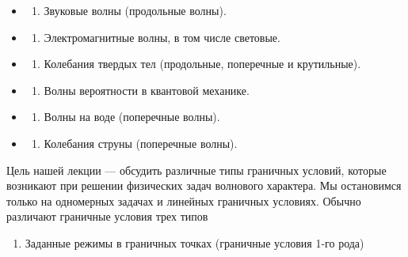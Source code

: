 \documentclass[
  ukrainian,
]{article}
\providecommand{\tightlist}{%
  \setlength{\itemsep}{0pt}\setlength{\parskip}{0pt}}
\begin{document}
\begin{itemize}
\tightlist
\item
  \begin{enumerate}
  \def\labelenumi{\arabic{enumi}.}
  \tightlist
  \item
    Звуковые волны (продольные волны).
  \end{enumerate}
\item
  \begin{enumerate}
  \def\labelenumi{\arabic{enumi}.}
  \setcounter{enumi}{1}
  \tightlist
  \item
    Электромагнитные волны, в том числе световые.
  \end{enumerate}
\item
  \begin{enumerate}
  \def\labelenumi{\arabic{enumi}.}
  \setcounter{enumi}{2}
  \tightlist
  \item
    Колебания твердых тел (продольные, поперечные и крутильные).
  \end{enumerate}
\item
  \begin{enumerate}
  \def\labelenumi{\arabic{enumi}.}
  \setcounter{enumi}{3}
  \tightlist
  \item
    Волны вероятности в квантовой механике.
  \end{enumerate}
\item
  \begin{enumerate}
  \def\labelenumi{\arabic{enumi}.}
  \setcounter{enumi}{4}
  \tightlist
  \item
    Волны на воде (поперечные волны).
  \end{enumerate}
\item
  \begin{enumerate}
  \def\labelenumi{\arabic{enumi}.}
  \setcounter{enumi}{5}
  \tightlist
  \item
    Колебания струны (поперечные волны).
  \end{enumerate}
\end{itemize}

Цель нашей лекции --- обсудить различные типы граничных условий, которые
возникают при решении физических задач волнового характера. Мы
остановимся только на одномерных задачах и линейных граничных условиях.
Обычно различают граничные условия трех типов

\begin{enumerate}
\def\labelenumi{\arabic{enumi}.}
\tightlist
\item
  Заданные режимы в граничных точках (граничные условия 1-го рода)
\end{enumerate}
\end{document}
